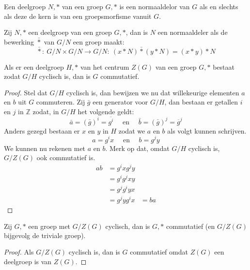 \documentclass[main.tex]{subfiles}
\begin{document}
\begin{gev}
  Een deelgroep $N,*$ van een groep $G,*$ is een normaaldelor van $G$ als en slechts als deze de kern is van een groepsmorfisme vanuit $G$.
  
\end{gev}

\begin{st}
  Zij $N,*$ een deelgroep van een groep $G,*$, dan is $N$ een normaaldeler als de bewerking $\bar{*}$ van $G/N$ een groep maakt:
  \[ \bar{*}:\ G/N \times G/N \rightarrow G/N:\ (x*N)\bar{*}(y*N) = (x*y)*N \]
  
\end{st}

\begin{st}
  \label{st:deelgroep-centrum-quotient-cyclisch-groep-commutatief}
  Als er een deelgroep $H,*$ van het centrum $Z(G)$ van een groep $G,*$ bestaat zodat $G/H$ cyclisch is, dan is $G$ commutatief.
  
  \begin{proof}
    Stel dat $G/H$ cyclisch is, dan bewijzen we nu dat willekeurige elementen $a$ en $b$ uit $G$ commuteren.
    Zij $\bar{g}$ een generator voor $G/H$, dan bestaan er getallen $i$ en $j$ in $\mathbb{Z}$ zodat, in $G/H$ het volgende geldt:
    \[ \bar{a} = (\bar{g})^{i} = \overline{g^{i}} \quad\text{ en }\quad \bar{b} = (\bar{g})^{j} = \overline{g}^{j} \]
    Anders gezegd bestaan er $x$ en $y$ in $H$ zodat we $a$ en $b$ als volgt kunnen schrijven.
\waarom
    \[ a = g^{i}x \quad\text{ en }\quad b = g^{j}y \]
    We kunnen nu rekenen met $a$ en $b$. Merk op dat, omdat $G/H$ cyclisch is, $G/Z(G)$ ook commutatief is.
    \[
    \begin{array}{rll}
      ab &= g^{i}xg^{j}y &\\
         &= g^{i}g^{j}xy &\\
         &= g^{j}g^{i}yx &\\
         &= g^{j}yg^{i}x &= ba
    \end{array}
    \]
  \end{proof}
\end{st}

\begin{st}
  Zij $G,*$ een groep met $G/Z(G)$ cyclisch, dan is $G,*$ commutatief (en $G/Z(G)$ bijgevolg de triviale groep).

  \begin{proof}
    Als $G/Z(G)$ cyclisch is, dan is $G$ commutatief omdat $Z(G)$ een deelgroep is van $Z(G)$.
  \end{proof}
\end{st}
\end{document}
